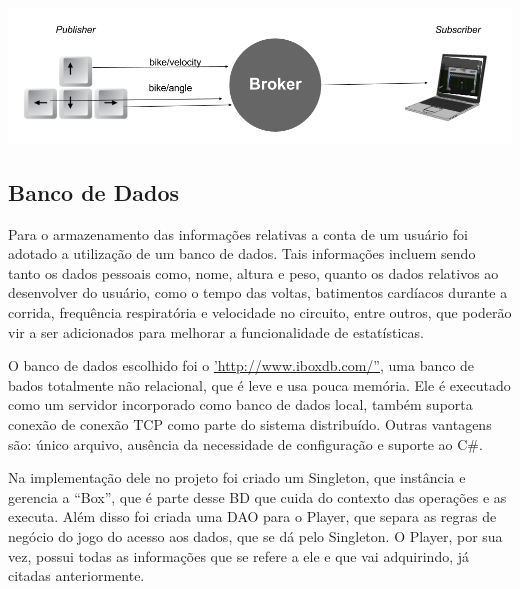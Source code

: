 \begin{center}
	\label{inputoutput}
	\includegraphics[scale=0.4]{figuras/inputoutp}
\end{center} 

\subsection{Banco de Dados}
Para o armazenamento das informações relativas a conta de um usuário foi adotado a utilização de um banco de dados. Tais informações incluem sendo tanto os dados pessoais como, nome, altura e peso, quanto os dados relativos ao desenvolver do usuário, como o tempo das voltas, batimentos cardíacos durante a corrida, frequência respiratória e velocidade no circuito, entre outros, que poderão vir a ser adicionados para melhorar a funcionalidade de estatísticas.

O banco de dados escolhido foi o \hyperref[iBoxBD]{'http://www.iboxdb.com/''}, uma banco de bados totalmente não relacional, que é leve e usa pouca memória. Ele é executado como um servidor incorporado como banco de dados local, também suporta conexão de conexão TCP como parte do sistema distribuído. Outras vantagens são: único arquivo, ausência da necessidade de configuração e suporte ao C\#. 
	
Na implementação dele no projeto foi criado um Singleton, que instância e gerencia a “Box”, que é parte desse BD que cuida do contexto das operações e as executa. Além disso foi criada uma DAO para o Player, que separa as regras de negócio do jogo do acesso aos dados, que se dá pelo Singleton. O Player, por sua vez, possui todas as informações que se refere a ele e que vai adquirindo, já citadas anteriormente.

